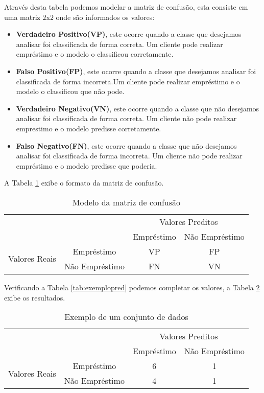 \documentclass[
12pt,				%
oneside,			%
a4paper,			%
english,			%
french,				%
spanish,			%
brazil				%
]{abntex2}
\begin{document}
Através desta tabela podemos modelar a matriz de confusão, esta consiste em uma matriz $2$x$2$ onde são informados os valores: 
\begin{itemize}

\item \textbf{Verdadeiro Positivo(VP)}, este ocorre quando a classe que desejamos analisar foi classificada de forma correta. Um cliente pode realizar empréstimo e o modelo o classificou corretamente.


\item \textbf{Falso Positivo(FP)}, este ocorre quando a classe que desejamos analisar foi classificada de forma incorreta.Um cliente pode realizar empréstimo e o modelo o classificou que não pode.

\item \textbf{Verdadeiro Negativo(VN)}, este ocorre quando a classe que não desejamos analisar foi classificada de forma correta. Um cliente não pode realizar emprestimo e o modelo predisse corretamente.

\item \textbf{Falso Negativo(FN)}, este ocorre quando a classe que não desejamos analisar foi classificada de forma incorreta. Um cliente não pode realizar empréstimo e o modelo predisse que poderia.
\end{itemize}

A Tabela \ref{tab:mc} exibe o formato da matriz de confusão.

\begin{table}[h]
	\centering
	\caption{Modelo da matriz de confusão}
	\begin{tabular}{ccc|c}
		&&\multicolumn{2}{c}{Valores Preditos}\\\cline{3-4}
		&& Empréstimo & Não Empréstimo \\\cline{3-4}
		\multirow{2}{*}{Valores Reais}& Empréstimo & VP & FP \\\cline{3-4}
		&Não Empréstimo & FN & VN\\
	\end{tabular}
	\label{tab:mc}
\end{table}

Verificando a Tabela \ref{tab:exemplopred} podemos completar os valores, a Tabela \ref{tab:mcr} exibe os resultados. 

\begin{table}[h]
	\centering
	\caption{Exemplo de um conjunto de dados}
	\begin{tabular}{ccc|c}
		&&\multicolumn{2}{c}{Valores Preditos}\\\cline{3-4}
		 && Empréstimo & Não Empréstimo \\\cline{3-4}
		\multirow{2}{*}{Valores Reais}& Empréstimo & 6 & 1 \\\cline{3-4}
		&Não Empréstimo & 4 & 1\\
		
	\end{tabular}
	\label{tab:mcr}
\end{table}
\end{document}
